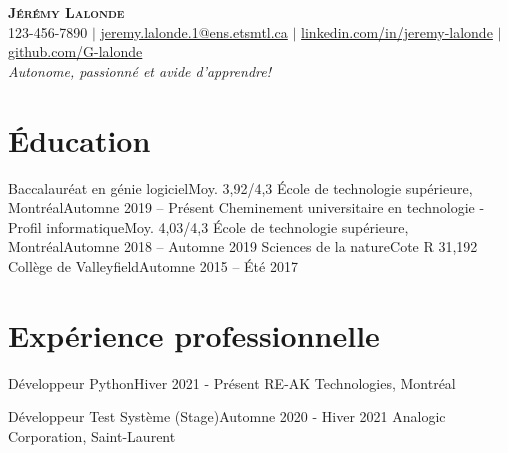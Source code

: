 \documentclass[letterpaper,11pt]{article}
\begin{document}
\begin{center}
  \textbf{\Huge \scshape J\'er\'emy Lalonde} \\ \vspace{5pt}
  \small 123-456-7890 $|$ \href{mailto:jeremy.lalonde.1@ens.etsmtl.ca}{jeremy.lalonde.1@ens.etsmtl.ca} $|$ 
  \href{https://linkedin.com/in/jeremy-lalonde}{linkedin.com/in/jeremy-lalonde} $|$
  \href{https://github.com/G-lalonde}{github.com/G-lalonde} \\ \vspace{3pt}
  \textit{\small {Autonome, passionn\'e et avide d'apprendre!}}
\end{center}

\section{\'Education}
  \resumeSubHeadingListStart
    \resumeSubheadingFour 
      {Baccalaur\'eat en g\'enie logiciel}{Moy. 3,92/4,3}
      {\'Ecole de technologie sup\'erieure, Montr\'eal}{Automne 2019 -- Pr\'esent}
    \resumeSubheadingFour 
      {Cheminement universitaire en technologie - Profil informatique}{Moy. 4,03/4,3}
      {\'Ecole de technologie sup\'erieure, Montr\'eal}{Automne 2018 -- Automne 2019}
    \resumeSubheadingFour
      {Sciences de la nature}{Cote R 31,192}
      {Coll\`ege de Valleyfield}{Automne 2015 -- \'Et\'e 2017}
  \resumeSubHeadingListEnd

\vspace{1pt}
\section{Exp\'erience professionnelle}
  \resumeSubHeadingListStart

    \resumeSubheadingThree
      {D\'eveloppeur Python}{Hiver 2021 - Pr\'esent}
      {RE-AK Technologies, Montr\'eal}
      \resumeItemListStart
      \resumeItemListEnd
    
      \vspace{-7pt}
    \resumeSubheadingThree
      {D\'eveloppeur Test Syst\`eme (Stage)}{Automne 2020 - Hiver 2021}
      {Analogic Corporation, Saint-Laurent}
      \resumeItemListStart
      \resumeItemListEnd
\end{document}
